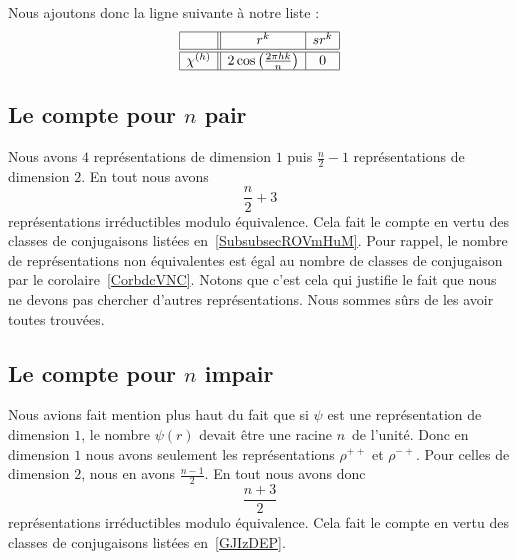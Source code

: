 Nous ajoutons donc la ligne suivante à notre liste :
\begin{equation*}
	\begin{array}[]{|c||c|c|}
		\hline
		           & r^k                                       & sr^k \\
		\hline\hline
		\chi^{(h)} & 2\cos\left( \frac{ 2\pi hk }{ n } \right) & 0    \\
		\hline
	\end{array}
\end{equation*}

\subsection{Le compte pour \texorpdfstring{$ n$}{n} pair}

Nous avons \( 4\) représentations de dimension \( 1\) puis \( \frac{ n }{2}-1\) représentations de dimension \( 2\). En tout nous avons
\begin{equation}
	\frac{ n }{2}+3
\end{equation}
représentations irréductibles modulo équivalence. Cela fait le compte en vertu des classes de conjugaisons listées en~\ref{SubsubsecROVmHuM}. Pour rappel, le nombre de représentations non équivalentes est égal au nombre de classes de conjugaison par le corolaire~\ref{CorbdcVNC}. Notons que c'est cela qui justifie le fait que nous ne devons pas chercher d'autres représentations. Nous sommes sûrs de les avoir toutes trouvées.

\subsection{Le compte pour \texorpdfstring{$ n$}{n} impair}

Nous avions fait mention plus haut du fait que si \( \psi\) est une représentation de dimension \( 1\), le nombre \( \psi(r)\) devait être une racine \( n\)\ieme\ de l'unité. Donc en dimension \( 1\) nous avons seulement les représentations \( \rho^{++}\) et \( \rho^{-+}\). Pour celles de dimension \( 2\), nous en avons \( \frac{ n-1 }{2}\). En tout nous avons donc
\begin{equation}
	\frac{ n+3 }{2}
\end{equation}
représentations irréductibles modulo équivalence. Cela fait le compte en vertu des classes de conjugaisons listées en~\ref{GJIzDEP}.
